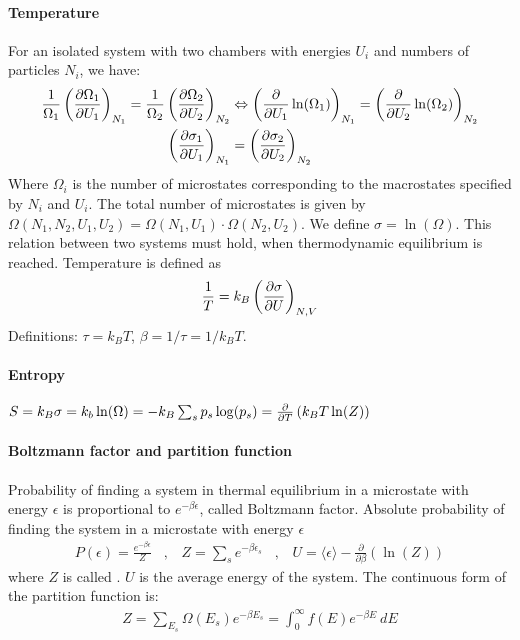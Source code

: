 \paragraph{Temperature}
For an isolated system with two chambers with energies $U_i$ and numbers of
particles $N_i$, we have:
\begin{align*}
    \frac{1}{\Omega_1} \left( \frac{\partial \Omega_1}{\partial U_1} \right)_{N_1}
    = \frac{1}{\Omega_2} \left( \frac{\partial \Omega_2}{\partial U_2} \right)_{N_2}
    &\Leftrightarrow
    \left( \frac{\partial}{\partial U_1} \ln (\Omega_1) \right)_{N_1}
    = \left( \frac{\partial}{\partial U_2} \ln (\Omega_2) \right)_{N_2}
    \\
    \left( \frac{\partial \sigma_1}{\partial U_1} \right)_{N_1}
    &= \left( \frac{\partial \sigma_2}{\partial U_2} \right)_{N_2}
\end{align*}
Where $\Omega_i$ is the number of microstates corresponding to the macrostates
specified by $N_i$ and $U_i$. The total number of microstates is given by
$\Omega(N_1 , N_2 , U_1 , U_2) = \Omega(N_1 , U_1) \cdot \Omega(N_2 , U_2)$.
We define $\sigma = \ln (\Omega)$. This relation between two systems must hold, 
when thermodynamic equilibrium is reached. Temperature is defined as
\begin{align*}
    \frac{1}{T} = k_B \left( \frac{\partial \sigma}{\partial U} \right)_{N,V}
\end{align*}
Definitions: $\tau = k_B T$, $\beta = 1 / \tau = 1 / k_B T$.

\paragraph{Entropy}
$S = k_B \sigma = k_b \ln (\Omega) = - k_B \sum_s p_s \log(p_s) =
\frac{\partial}{\partial T} \left( k_B T \ln(Z) \right)$

\paragraph{Boltzmann factor and partition function}
Probability of finding a system in thermal equilibrium in a microstate with energy
$\epsilon$ is proportional to $e^{-\beta \epsilon}$, called Boltzmann factor.
Absolute probability of finding the system in a microstate with energy $\epsilon$
\begin{align*}
    P(\epsilon) = \frac{e^{-\beta \epsilon}}{Z}
    \hspace{10pt} , \hspace{10pt}
    Z = \sum_s e^{-\beta \epsilon_s}
    \hspace{10pt} , \hspace{10pt}
    U = \langle \epsilon \rangle - \frac{\partial}{\partial \beta} (\ln (Z))
\end{align*}
where $Z$ is called . $U$ is the average energy of the system.
The continuous form of the partition function is:
\begin{align*}
    Z
    = \sum_{E_s} \Omega (E_s) e^{-\beta E_s}
    = \int_0^\infty f(E) e^{-\beta E} \ d E
\end{align*}

